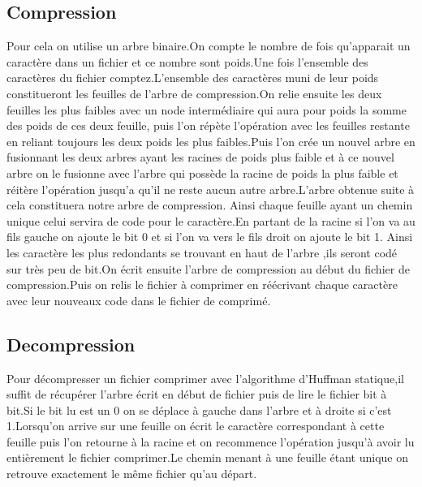 \documentclass{report}
\begin{document}
\subsection{Compression}
Pour cela on utilise un arbre binaire.On compte le nombre de fois qu'apparait un caractère dans un fichier et ce nombre  sont poids.Une fois l'ensemble des caractères du fichier comptez.L'ensemble des caractères muni de leur poids constitueront les feuilles de  l'arbre de compression.On relie ensuite les deux feuilles les plus faibles avec un node intermédiaire qui aura pour poids  la somme des poids de ces deux feuille, puis l'on répète l'opération avec les feuilles restante en reliant toujours les deux poids les plus faibles.Puis l'on crée un nouvel arbre en fusionnant les deux arbres ayant les racines de poids plus faible et à ce nouvel arbre on le fusionne avec l'arbre qui possède la racine de poids la plus faible et réitère l'opération jusqu'a qu'il ne reste aucun autre arbre.L'arbre obtenue suite à cela constituera notre arbre de compression. Ainsi chaque feuille ayant un chemin unique celui servira de code pour le caractère.En partant de la racine si l'on va au fils gauche on ajoute le bit 0 et si l'on va vers le fils droit on ajoute le bit 1. Ainsi les caractère les plus redondants se trouvant en haut de l'arbre ,ils seront codé sur très peu de bit.On écrit ensuite l'arbre de compression au début du fichier de compression.Puis on relis le fichier à comprimer en réécrivant chaque caractère avec leur nouveaux code dans le fichier de comprimé.
\subsection{Decompression}
Pour décompresser un fichier comprimer avec l'algorithme d'Huffman statique,il suffit de récupérer l'arbre écrit en début de fichier puis de lire le fichier bit à bit.Si le bit lu est un 0 on se déplace à gauche dans l'arbre et à droite si c'est 1.Lorsqu'on arrive sur une feuille on écrit le caractère correspondant à cette feuille puis l'on retourne à la racine et on recommence l'opération jusqu'à avoir lu entièrement le fichier comprimer.Le chemin menant à une feuille étant unique on retrouve exactement le même fichier qu'au départ.
\end{document}
